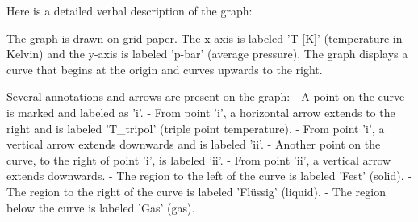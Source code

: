 Here is a detailed verbal description of the graph:

The graph is drawn on grid paper. The x-axis is labeled 'T [K]' (temperature in Kelvin) and the y-axis is labeled 'p-bar' (average pressure). The graph displays a curve that begins at the origin and curves upwards to the right.

Several annotations and arrows are present on the graph:
- A point on the curve is marked and labeled as 'i'.
- From point 'i', a horizontal arrow extends to the right and is labeled 'T_tripol' (triple point temperature).
- From point 'i', a vertical arrow extends downwards and is labeled 'ii'.
- Another point on the curve, to the right of point 'i', is labeled 'ii'.
- From point 'ii', a vertical arrow extends downwards.
- The region to the left of the curve is labeled 'Fest' (solid).
- The region to the right of the curve is labeled 'Flüssig' (liquid).
- The region below the curve is labeled 'Gas' (gas).